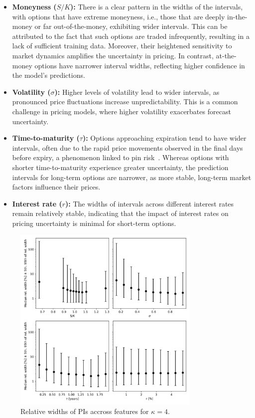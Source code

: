 \documentclass{article}
\theoremstyle{definition}
\begin{document}
\begin{itemize}
    \item \textbf{Moneyness ($S/K$):} There is a clear pattern in the widths of the intervals, with options that have extreme moneyness, i.e., those that are deeply in-the-money or far out-of-the-money, exhibiting wider intervals. This can be attributed to the fact that such options are traded infrequently, resulting in a lack of sufficient training data. Moreover, their heightened sensitivity to market dynamics amplifies the uncertainty in pricing. In contrast, at-the-money options have narrower interval widths, reflecting higher confidence in the model’s predictions.
    \item \textbf{Volatility ($\sigma$):} Higher levels of volatility lead to wider intervals, as pronounced price fluctuations increase unpredictability. This is a common challenge in pricing models, where higher volatility exacerbates forecast uncertainty.
    \item \textbf{Time-to-maturity ($\tau$):} Options approaching expiration tend to have wider intervals, often due to the rapid price movements observed in the final days before expiry, a phenomenon linked to pin risk~\cite{GOLEZ2012566}. Whereas options with shorter time-to-maturity experience greater uncertainty, the prediction intervals for long-term options are narrower, as more stable, long-term market factors influence their prices.
    \item \textbf{Interest rate ($r$):} The widths of intervals across different interest rates remain relatively stable, indicating that the impact of interest rates on pricing uncertainty is minimal for short-term options.
\end{itemize}

\begin{figure}[H]
\centering
\includegraphics[width=0.8\textwidth]{reports/figures/simulated_data/sim_kappa4_rel_widths_to_features.png}
\caption{Relative widths of PIs accross features for $\kappa=4$.}
\label{fig:kappa4_rel_widths_vs_features}
\end{figure}
\end{document}
